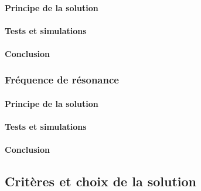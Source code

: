 \paragraph{Principe de la solution}

\paragraph{Tests et simulations}

\paragraph{Conclusion}

\subsubsection{Fréquence de résonance}
\paragraph{Principe de la solution}

\paragraph{Tests et simulations}

\paragraph{Conclusion}


\subsection{Critères et choix de la solution}

